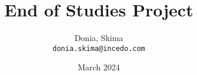 \usepackage[utf8]{inputenc}
\usepackage{glossaries-extra}

\title{End of Studies Project}
\author{
    Donia, Skima\\
    \texttt{donia.skima@incedo.com}
}
\date{March 2024}

\usepackage{pdfpages}
\usepackage{natbib}
\usepackage{graphicx}
\usepackage{epstopdf}
\usepackage{float}
\usepackage{tabularx}
\usepackage{colortbl}
\usepackage{multirow}
\usepackage{caption}
\usepackage{chngcntr}
\usepackage[hyphens]{url}
\usepackage{listings}
\usepackage{color}
\usepackage{textcomp}
\usepackage[toc,page]{appendix}
\usepackage{ragged2e}
\usepackage{enumitem}
\usepackage[parfill]{parskip} %
\usepackage{fancyhdr}
\usepackage[nohints]{minitoc}


\usepackage{fancyhdr}
\pagestyle{fancy}
\fancyhead{} %
\fancyhead[RO,LE]{\small\leftmark}
\fancyfoot{} %
\fancyfoot[C]{\thepage}

\usepackage{csquotes}
\usepackage{graphicx} %
\usepackage{svg}
\usepackage{emptypage}

\usepackage{pdflscape} %

\usepackage{titlesec}
\usepackage{hyperref}  %
\hypersetup{
  colorlinks,
  citecolor=black,
  filecolor=black,
  linkcolor=black,
  urlcolor=black
}
\usepackage{multirow}
\renewcommand\arraystretch{1.5}

\usepackage{enumitem}

\usepackage{lipsum} %
